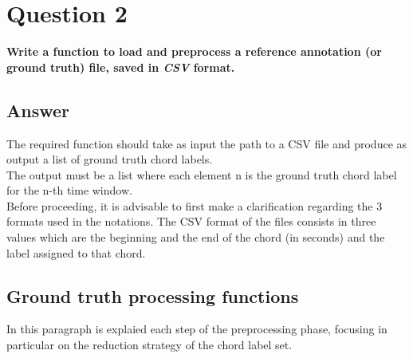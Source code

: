 \documentclass{article}
\begin{document}

\section*{\color{red}Question 2}

\begin{problem}
	\textbf{Write a function to load and preprocess a reference annotation (or ground truth) file, saved in \emph{CSV} format.}
\end{problem}

\subsection*{\color{blue}Answer}

The required function should take as input the path to a CSV file and produce as output a list of ground truth chord labels.\\
The output must be a list where each element
n is the ground truth chord label for the n-th time window.\\
Before proceeding, it is advisable to first make a clarification regarding the 3 formats used in the notations.
The CSV format of the files consists in three values which are the beginning and the end of the chord (in seconds) and the label assigned to that chord.


\subsection*{Ground truth processing functions}

In this paragraph is explaied each step of the preprocessing phase, focusing in particular on the reduction strategy of the chord label set.
\end{document}
